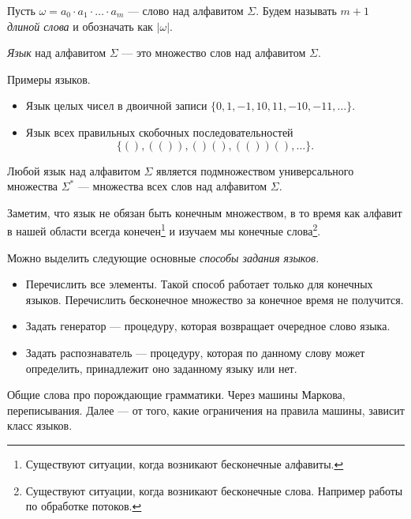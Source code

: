 \begin{definition}
Пусть $\omega = a_0 \cdot a_1 \cdot \ldots \cdot a_m$ --- слово над алфавитом $\Sigma$.
Будем называть $m + 1$ \textit{длиной слова} и обозначать как $|\omega|$.
\end{definition}

\begin{definition}
\textit{Язык} над алфавитом $\Sigma$ --- это множество слов над алфавитом $\Sigma$.
\end{definition}

\begin{example}

Примеры языков.

  \begin{itemize}
    \item Язык целых чисел в двоичной записи $\{0, 1, -1, 10, 11, -10, -11, \dots\}.$
    \item Язык всех правильных скобочных последовательностей $$\{(), (()), ()(), (())(), \dots\}.$$
  \end{itemize}
\end{example}

Любой язык над алфавитом $\Sigma$ является подмножеством универсального множества $\Sigma^*$ --- множества всех слов над алфавитом $\Sigma$.

Заметим, что язык не обязан быть конечным множеством, в то время как алфавит в нашей области всегда конечен\footnote{Существуют ситуации, когда возникают бесконечные алфавиты.} и изучаем мы конечные слова\footnote{Существуют ситуации, когда возникают бесконечные слова. Например работы по обработке потоков.}.

Можно выделить следующие основные \textit{способы задания языков.}
\begin{itemize}
\item Перечислить все элементы. Такой способ работает только для конечных языков. Перечислить бесконечное множество за конечное время не получится.
\item Задать генератор --- процедуру, которая возвращает очередное слово языка.
\item Задать распознаватель --- процедуру, которая по данному слову может определить, принадлежит оно заданному языку или нет.
\end{itemize}


Общие слова про порождающие грамматики. Через машины Маркова, переписывания. Далее --- от того, какие ограничения на правила машины, зависит класс языков.


